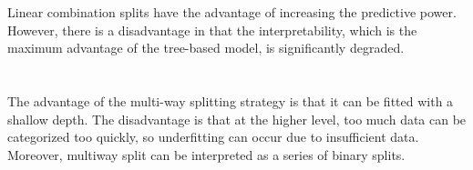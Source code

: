 \documentclass[11pt,a4paper]{article}
\begin{document}
Linear combination splits have the advantage of increasing the predictive power. However, there is a disadvantage in that the interpretability, which is the maximum advantage of the tree-based model, is significantly degraded.

\section{}

The advantage of the multi-way splitting strategy is that it can be fitted with a shallow depth. The disadvantage is that at the higher level, too much data can be categorized too quickly, so underfitting can occur due to insufficient data. Moreover, multiway split can be interpreted as a series of binary splits.
\end{document}
